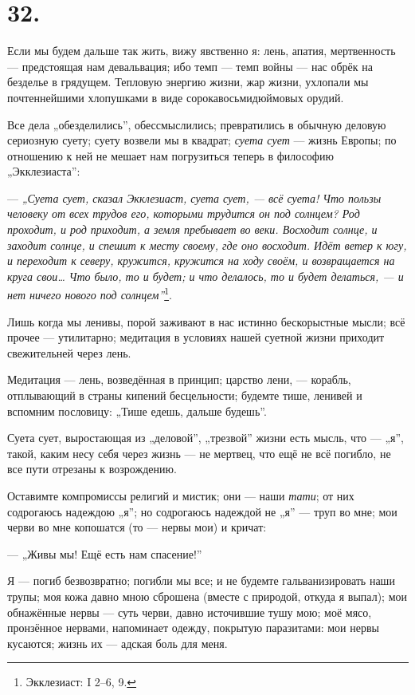 \documentclass[12pt,a4paper,oneside]{book}
\begin{document}
\section*{32.}

Если мы будем дальше так жить, вижу явственно я: лень, апатия, мертвенность — предстоящая нам девальвация; ибо темп — темп войны — нас обрёк на безделье в грядущем. Тепловую энергию жизни, жар жизни, ухлопали мы почтеннейшими хлопушками в виде сорокавосьмидюймовых орудий.

Все дела „обезделились”, обессмыслились; превратились в обычную деловую сериозную суету; суету возвели мы в квадрат; \emph{суета сует} — жизнь Европы; по отношению к ней не мешает нам погрузиться теперь в философию „Экклезиаста”:

— \emph{„Суета сует, сказал Экклезиаст, суета сует, — всё суета! Что пользы человеку от всех трудов его, которыми трудится он под солнцем? Род проходит, и род приходит, а земля пребывает во веки. Восходит солнце, и заходит солнце, и спешит к месту своему, где оно восходит. Идёт ветер к югу, и переходит к северу, кружится, кружится на ходу своём, и возвращается на круга свои… Что было, то и будет; и что делалось, то и будет делаться, — и нет ничего нового под солнцем”}\footnote{Экклезиаст: I 2–6, 9.}.

Лишь когда мы ленивы, порой заживают в нас истинно бескорыстные мысли; всё прочее — утилитарно; медитация в условиях нашей суетной жизни приходит свежительней через лень.

Медитация — лень, возведённая в принцип; царство лени, — корабль, отплывающий в страны кипений бесцельности; будемте тише, ленивей и вспомним пословицу: „Тише едешь, дальше будешь”.

Суета сует, выростающая из „деловой”, „трезвой” жизни есть мысль, что — „я”, такой, каким несу себя через жизнь — не мертвец, что ещё не всё погибло, не все пути отрезаны к возрождению.

Оставимте компромиссы религий и мистик; они — наши \emph{тати}; от них содрогаюсь надеждою „я”; но содрогаюсь надеждой не „я” — труп во мне; мои черви во мне копошатся (то — нервы мои) и кричат:

— „Живы мы! Ещё есть нам спасение!”

Я — погиб безвозвратно; погибли мы все; и не будемте гальванизировать наши трупы; моя кожа давно мною сброшена (вместе с природой, откуда я выпал); мои обнажённые нервы — суть черви, давно источившие тушу мою; моё мясо, пронзённое нервами, напоминает одежду, покрытую паразитами: мои нервы кусаются; жизнь их — адская боль для меня.
\end{document}
